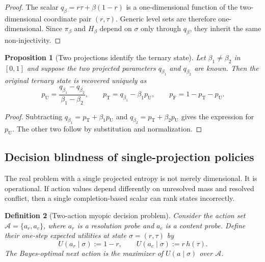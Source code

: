 \documentclass[11pt]{article}
\newtheorem{definition}{Definition}[section]
\newtheorem{proposition}[definition]{Proposition}
\newcommand{\T}{\mathrm{T}}
\newcommand{\F}{\mathrm{F}}
\newcommand{\U}{\mathrm{U}}
\newcommand{\1}{\mathbf{1}}
\newcommand{\hbin}{h}
\begin{document}
\begin{proof}
The scalar $q_\beta=r\tau+\beta(1-r)$ is a one-dimensional function of the two-dimensional coordinate pair $(r,\tau)$. Generic level sets are therefore one-dimensional. Since $\pi_\beta$ and $H_\beta$ depend on $\sigma$ only through $q_\beta$, they inherit the same non-injectivity.
\end{proof}

\begin{proposition}[Two projections identify the ternary state]
\label{prop:two-projections}
Let $\beta_1\neq \beta_2$ in $[0,1]$ and suppose the two projected parameters $q_{\beta_1}$ and $q_{\beta_2}$ are known. Then the original ternary state is recovered uniquely as
\begin{equation}
 p_\U=\frac{q_{\beta_1}-q_{\beta_2}}{\beta_1-\beta_2},
 \qquad
 p_\T=q_{\beta_1}-\beta_1 p_\U,
 \qquad
 p_\F=1-p_\T-p_\U.
 \label{eq:two-proj-recovery}
\end{equation}
\end{proposition}

\begin{proof}
Subtracting $q_{\beta_1}=p_\T+\beta_1 p_\U$ and $q_{\beta_2}=p_\T+\beta_2 p_\U$ gives the expression for $p_\U$. The other two follow by substitution and normalization.
\end{proof}

\subsection{Decision blindness of single-projection policies}

The real problem with a single projected entropy is not merely dimensional. It is operational. If action values depend differently on unresolved mass and resolved conflict, then a single completion-based scalar can rank states incorrectly.

\begin{definition}[Two-action myopic decision problem]
Consider the action set $\mathcal{A}=\{a_r,a_c\}$, where $a_r$ is a \emph{resolution probe} and $a_c$ is a \emph{content probe}. Define their one-step expected utilities at state $\sigma=(r,\tau)$ by
\begin{equation}
U(a_r\mid \sigma):=1-r,
\qquad
U(a_c\mid \sigma):=r\,\hbin(\tau).
\label{eq:toy-utility}
\end{equation}
The Bayes-optimal next action is the maximizer of $U(a\mid\sigma)$ over $\mathcal{A}$.
\end{definition}
\end{document}

